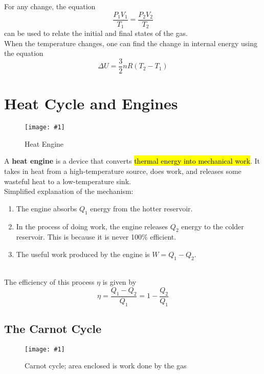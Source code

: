 \documentclass[a4paper,12pt]{article}
\let\oldsection\section
\renewcommand\section{\clearpage\oldsection}
\newcommand{\lb}{\\[8pt]}
\newcommand{\img}[4]{\begin{center}
  \begin{figure}[H]
    \centering
    \texttt{[image: \#1]}
    \caption{#3}
    \label{fig:#4}
  \end{figure}
\end{center}}
\begin{document}
For any change, the equation $$\frac{P_1V_1}{T_1} = \frac{P_2V_2}{T_2}$$ can be used to relate the initial and final states of the gas.\lb
When the temperature changes, one can find the change in internal energy using the equation $$\Delta U = \frac{3}{2}nR(T_2 - T_1)$$

\section{Heat Cycle and Engines}


\begin{minipage}{0.35\textwidth}
  \img{engine.png}{1}{Heat Engine}{heatengine}
\end{minipage}\hspace*{0.02\textwidth}%
\begin{minipage}{0.6\textwidth}
  A \textbf{heat engine} is a device that converts \hl{thermal energy into mechanical work}. It takes in heat from a high-temperature source, does work, and releases some wasteful heat to a low-temperature sink.\lb
  Simplified explanation of the mechanism:
  \begin{enumerate}
    \item The engine absorbs $Q_1$ energy from the hotter reservoir.
    \item In the process of doing work, the engine releases $Q_2$ energy to the colder reservoir. This is because it is never 100\% efficient.
    \item The useful work produced by the engine is $W = Q_1 - Q_2$.
  \end{enumerate}
\end{minipage}\lb

The efficiency of this process $\eta$ is given by
\begin{equation}\label{eq:heat_engine_efficiency}
  \eta = \frac{Q_1 - Q_2}{Q_1} = 1 - \dfrac{Q_2}{Q_1}
\end{equation}

\pagebreak

\subsection{The Carnot Cycle}

\img{carnot.png}{0.5}{Carnot cycle; area enclosed is work done by the gas}{carnot}
\end{document}
